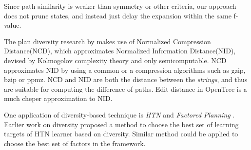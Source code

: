 
Since path similarity is weaker than symmetry or other criteria, our approach does not prune states, and instead just delay the expansion within the same f-value.

The plan diversity research by \cite{goldman2015measuring} makes use of Normalized Compression Distance(NCD), which approximates Normalized Information Distance(NID), devised by Kolmogolov complexity theory and only semicomputable. NCD approximates NID by using a common or a \sota compression algorithms such as gzip, bzip or ppmz. NCD and NID are both the distance between the  \emph{strings}, and thus are suitable for computing the difference of paths. Edit distance in OpenTree is a much cheper approximation to NID.

One application of diversity-based technique is \emph{HTN} \cite{erol1994} and \emph{Factored Planning} \cite{amir2003factored,brafman2006factored,Asai2015}. Earlier work on diversity \cite{goldman2015measuring} proposed a method to choose the best set of learning targets of HTN learner based on diversity. Similar method could be applied to choose the best set of factors in the framework.
